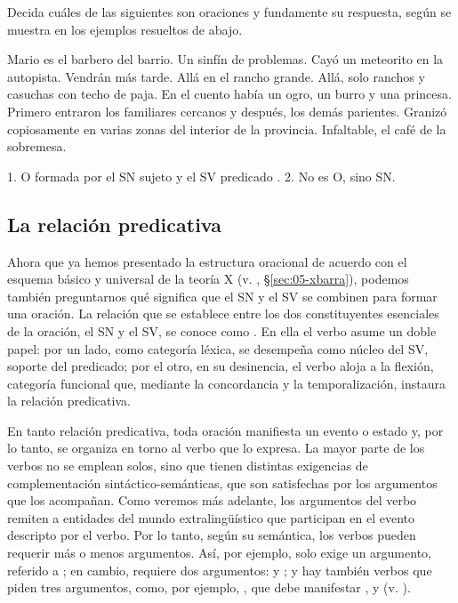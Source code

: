 \begin{ejercicio}\label{ej:06-esoracion}
Decida cuáles de las siguientes son oraciones y fundamente su respuesta, según
se muestra en los ejemplos resueltos de abajo.

\begin{exe}
  \ex Mario es el barbero del barrio.
  \ex Un sinfín de problemas.
  \ex Cayó un meteorito en la autopista.
  \ex Vendrán más tarde.
  \ex Allá en el rancho grande.
  \ex Allá, solo ranchos y casuchas con techo de paja.
  \ex En el cuento había un ogro, un burro y una princesa.
  \ex Primero entraron los familiares cercanos y después, los demás parientes.
  \ex Granizó copiosamente en varias zonas del interior de la provincia.
  \ex Infaltable, el café de la sobremesa.
\end{exe}

\begin{resuelto}
1. O formada por el SN sujeto  y el SV predicado . 2. No es O, sino SN.
\end{resuelto}
\end{ejercicio}

\subsection{La relación predicativa}\label{sec:06-predicativa}

Ahora que ya hemos presentado la estructura oracional de acuerdo con el esquema
básico y universal de la teoría X\prima{} (v. ,
§\ref{sec:05-xbarra}), podemos también preguntarnos qué significa que el SN y el
SV se combinen para formar una oración. La relación que se establece entre los
dos constituyentes esenciales de la oración, el SN y el SV, se conoce como
. En ella el verbo asume un doble papel: por un lado, como
categoría léxica, se desempeña como núcleo del SV, soporte del predicado; por el
otro, en su desinencia, el verbo aloja a la flexión, categoría funcional que,
mediante la concordancia y la temporalización, instaura la relación
predicativa.

En tanto relación predicativa, toda oración manifiesta un evento o estado y, por
lo tanto, se organiza en torno al verbo que lo expresa. La mayor parte de los
verbos no se emplean solos, sino que tienen distintas exigencias de
complementación sintáctico-semánticas, que son satisfechas por los argumentos
que los acompañan. Como veremos más adelante, los argumentos del verbo remiten a
entidades del mundo extralingüístico que participan en el evento descripto por
el verbo. Por lo tanto, según su semántica, los verbos pueden requerir más o
menos argumentos. Así, por ejemplo,  solo exige un argumento,
referido a  ; en
cambio,  requiere dos argumentos:  y
 ; y hay también verbos que
piden tres argumentos, como, por ejemplo, , que debe manifestar
,  y   (v. ).

